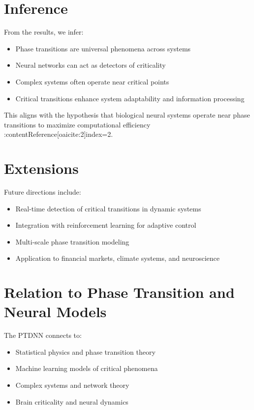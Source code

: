 \documentclass[12pt]{article}
\begin{document}
\section{Inference}

From the results, we infer:

\begin{itemize}
\item Phase transitions are universal phenomena across systems
\item Neural networks can act as detectors of criticality
\item Complex systems often operate near critical points
\item Critical transitions enhance system adaptability and information processing
\end{itemize}

This aligns with the hypothesis that biological neural systems operate near phase transitions to maximize computational efficiency :contentReference[oaicite:2]{index=2}.

\section{Extensions}

Future directions include:

\begin{itemize}
\item Real-time detection of critical transitions in dynamic systems
\item Integration with reinforcement learning for adaptive control
\item Multi-scale phase transition modeling
\item Application to financial markets, climate systems, and neuroscience
\end{itemize}

\section{Relation to Phase Transition and Neural Models}

The PTDNN connects to:

\begin{itemize}
\item Statistical physics and phase transition theory
\item Machine learning models of critical phenomena
\item Complex systems and network theory
\item Brain criticality and neural dynamics
\end{itemize}
\end{document}
